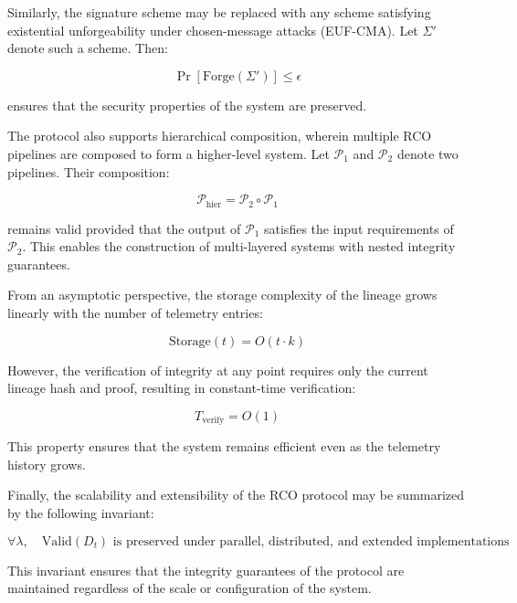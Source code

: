 Similarly, the signature scheme may be replaced with any scheme satisfying existential unforgeability under chosen-message attacks (EUF-CMA). Let $\Sigma'$ denote such a scheme. Then:

\begin{equation}
\Pr[\text{Forge}(\Sigma')] \leq \epsilon
\end{equation}

ensures that the security properties of the system are preserved.

The protocol also supports hierarchical composition, wherein multiple RCO pipelines are composed to form a higher-level system. Let $\mathcal{P}_1$ and $\mathcal{P}_2$ denote two pipelines. Their composition:

\begin{equation}
\mathcal{P}_{\text{hier}} = \mathcal{P}_2 \circ \mathcal{P}_1
\end{equation}

remains valid provided that the output of $\mathcal{P}_1$ satisfies the input requirements of $\mathcal{P}_2$. This enables the construction of multi-layered systems with nested integrity guarantees.

From an asymptotic perspective, the storage complexity of the lineage grows linearly with the number of telemetry entries:

\begin{equation}
\text{Storage}(t) = O(t \cdot k)
\end{equation}

However, the verification of integrity at any point requires only the current lineage hash and proof, resulting in constant-time verification:

\begin{equation}
T_{\text{verify}} = O(1)
\end{equation}

This property ensures that the system remains efficient even as the telemetry history grows.

Finally, the scalability and extensibility of the RCO protocol may be summarized by the following invariant:

\begin{equation}
\forall \lambda, \quad \text{Valid}(D_t) \text{ is preserved under parallel, distributed, and extended implementations}
\end{equation}

This invariant ensures that the integrity guarantees of the protocol are maintained regardless of the scale or configuration of the system.

